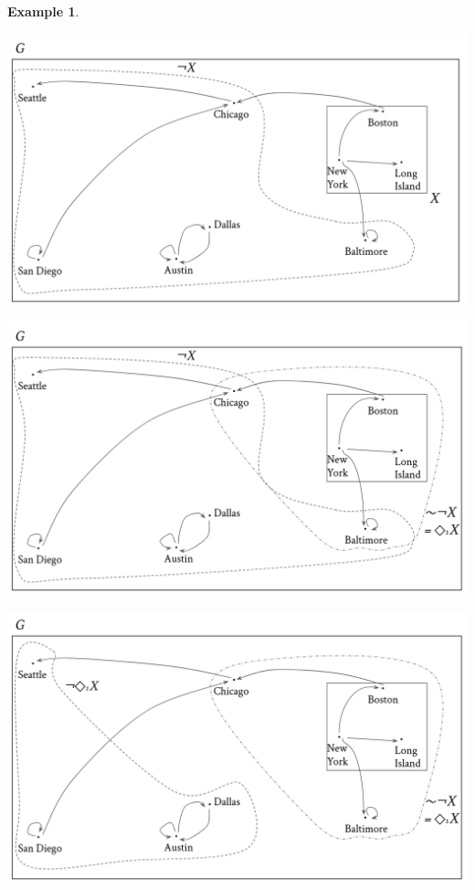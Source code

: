 \documentclass[a4paper]{book}
\theoremstyle{definition}
\newtheorem{example}{Example}[section]
\theoremstyle{definition}
\theoremstyle{definition}
\theoremstyle{theorem}
\theoremstyle{definition}
\begin{document}
\begin{example}
	\begin{center}
		\includegraphics*[scale=0.2]{RoutesGraph4.png}
	\end{center}
	\begin{center}
		\includegraphics*[scale=0.2]{RoutesGraph5.png}
	\end{center}
	\begin{center}
		\includegraphics*[scale=0.2]{RoutesGraph6.png}

\end{center}
\end{example}
\end{document}
